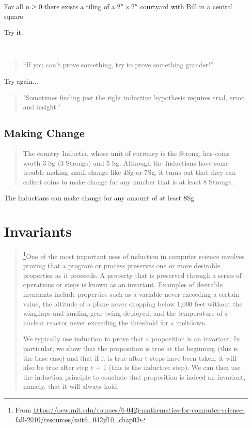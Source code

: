 \documentclass[12pt]{article}
\begin{document}
\begin{theorem}
    For all $n \geq 0$ there exists a tiling of a $2^n \times 2^n$ courtyard with Bill in a central square.
\end{theorem}

Try it.

~\\\emptybox{5em}

\begin{quote}
    ``If you can't prove something, try to prove something grander!''
\end{quote}
Try again...

\vfill

\begin{quote}
    "Sometimes finding just the right induction hypothesis requires trial, error, and insight."
\end{quote}


\clearpage
\subsection{Making Change}

\begin{quote}
The country Inductia, whose unit of currency is the Strong, has coins worth 3 Sg (3 Strongs) and 5 Sg. Although the Inductians have some trouble making small change like 4Sg or 7Sg, it turns out that they can collect coins to make change for any number that is at least 8 Strongs.
\end{quote}

\begin{theorem}
    The Inductians can make change for any amount of at least 8Sg.
\end{theorem}


\clearpage
\section{Invariants}

\begin{quote}
    \footnote{From \url{https://ocw.mit.edu/courses/6-042j-mathematics-for-computer-science-fall-2010/resources/mit6_042jf10_chap03}}One of the most important uses of induction in computer science involves proving that a program or process preserves one or more desirable properties as it proceeds.
A property that is preserved through a series of operations or steps is known as an invariant. Examples of desirable invariants include properties such as a variable never exceeding a certain value, the altitude of a plane never dropping below 1,000
feet without the wingflaps and landing gear being deployed, and the temperature of a nuclear reactor never exceeding the threshold for a meltdown.

We typically use induction to prove that a proposition is an invariant. In particular, we show that the proposition is true at the beginning (this is the base case) and that if it is true after t steps have been taken, it will also be true after step t + 1 (this is the inductive step). We can then use the induction principle to conclude that  proposition is indeed an invariant, namely, that it will always hold.
\end{quote}
\end{document}
